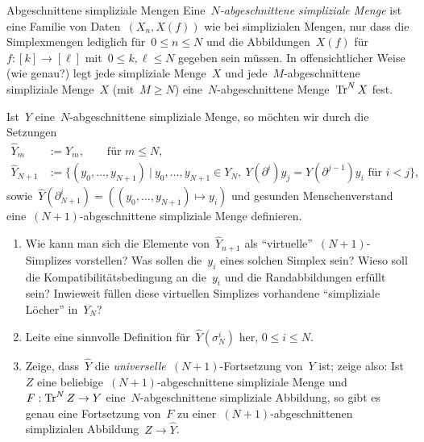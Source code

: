 \documentclass{uebblatt}
\begin{document}
\begin{aufgabe}{Abgeschnittene simpliziale Mengen}
Eine~\emph{$N$-abgeschnittene simpliziale Menge} ist eine Familie von
Daten~$(X_n,X(f))$ wie bei simplizialen Mengen, nur dass die Simplexmengen
lediglich für~$0 \leq n \leq N$ und die Abbildungen~$X(f)$ für~$f : [k] \to
[\ell]$ mit~$0 \leq k,\ell \leq N$ gegeben sein müssen. In offensichtlicher Weise
(wie genau?) legt jede simpliziale Menge~$X$ und jede~$M$-abgeschnittene
simpliziale Menge~$X$ (mit~$M \geq N$) eine~$N$-abgeschnittene Menge~$\operatorname{Tr}^N X$
fest.

Ist~$Y$ eine~$N$-abgeschnittene simpliziale Menge, so möchten wir durch die
Setzungen
\begin{align*}
  \widehat Y_m &:= Y_m, \qquad \text{für $m \leq N$,} \\
  \widehat Y_{N+1} &:= \{ (y_0,\ldots,y_{N+1}) \ |\
    y_0,\ldots,y_{N+1} \in Y_N,\
    \text{$Y(\partial^i)y_j = Y(\partial^{j-1})y_i$ für~$i < j$} \},
\end{align*}
sowie~$\widehat Y(\partial^i_{N+1}) = ((y_0,\ldots,y_{N+1}) \mapsto y_i)$
und gesunden Menschenverstand eine~$(N+1)$-abgeschnittene simpliziale Menge
definieren.

\begin{enumerate}
\item Wie kann man sich die Elemente von~$\widehat Y_{n+1}$ als
"`virtuelle"'~$(N+1)$-Simplizes vorstellen? Was sollen die~$y_i$ eines solchen
Simplex sein? Wieso soll die Kompatibilitätsbedingung an die~$y_i$ und die
Randabbildungen erfüllt sein? Inwieweit füllen diese virtuellen Simplizes
vorhandene "`simpliziale Löcher"' in~$Y_N$?

\item Leite eine sinnvolle Definition für~$\widehat Y(\sigma^i_N)$ her, $0 \leq i \leq N$.

\item Zeige, dass~$\widehat Y$ die \emph{universelle}~$(N+1)$-Fortsetzung
von~$Y$ ist; zeige also: Ist~$Z$ eine beliebige~$(N+1)$-abgeschnittene
simpliziale Menge und~$F : \operatorname{Tr}^N Z \to Y$ eine~$N$-abgeschnittene simpliziale
Abbildung, so gibt es genau eine Fortsetzung von~$F$ zu
einer~$(N+1)$-abgeschnittenen simplizialen Abbildung~$Z \to \widehat Y$.
\end{enumerate}
\end{aufgabe}
\end{document}
